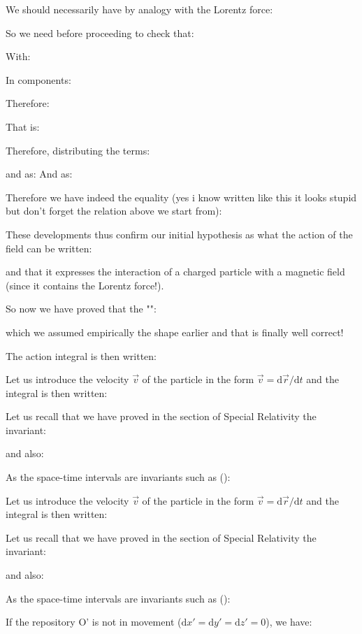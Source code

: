 	We should necessarily have by analogy with the Lorentz force:
	
	So we need before proceeding to check that:
	
	With:
	
	In components:
	
	Therefore:
	
	That is:
	
	Therefore, distributing the terms:
	
	and as:
	And as:
	
	Therefore we have indeed the equality (yes i know written like this it looks stupid but don't forget the relation above we start from):
	
	These developments thus confirm our initial hypothesis as what the action of the field can be written:
	
	and that it expresses the interaction of a charged particle with a magnetic field (since it contains the Lorentz force!).

	So now we have proved that the "":
	
	which we assumed empirically the shape earlier and that is finally well correct!

	The action integral is then written:
	
	Let us introduce the velocity $\vec{v}$ of the particle in the form $\vec{v}=\mathrm{d}\vec{r}/\mathrm{d}t$ and the integral is then written:
	
	Let us recall that we have proved in the section of Special Relativity the invariant:
	
	and also:
	
	As the space-time intervals are invariants such as ():
	
	Let us introduce the velocity $\vec{v}$ of the particle in the form $\vec{v}=\mathrm{d}\vec{r}/\mathrm{d}t$ and the integral is then written:
	
	Let us recall that we have proved in the section of Special Relativity the invariant:
	
	and also:
	
	As the space-time intervals are invariants such as ():
	
	If the repository O' is not in movement ($\mathrm{d}x'=\mathrm{d}y'=\mathrm{d}z'=0$), we have:
	
